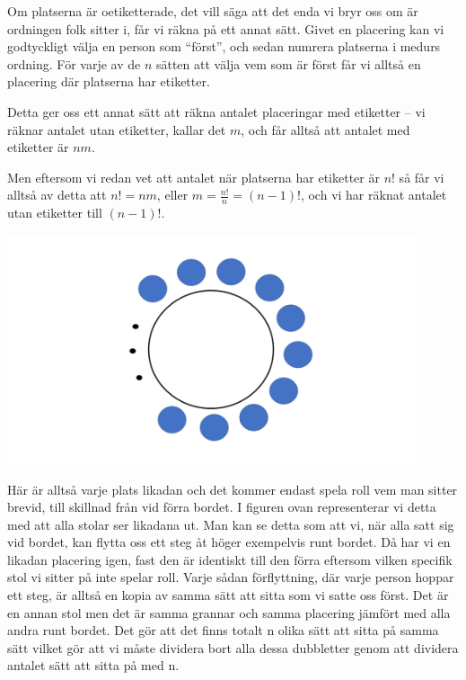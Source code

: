 \documentclass{tufte-handout}
\begin{document}
\begin{example}
	Om platserna är oetiketterade, det vill säga att det enda vi bryr oss om är ordningen folk sitter i, får vi räkna på ett annat sätt. Givet en placering kan vi godtyckligt välja en person som ``först'', och sedan numrera platserna i medurs ordning. För varje av de $n$ sätten att välja vem som är först får vi alltså en placering där platserna har etiketter.

	Detta ger oss ett annat sätt att räkna antalet placeringar med etiketter -- vi räknar antalet utan etiketter, kallar det $m$, och får alltså att antalet med etiketter är $nm$.

	Men eftersom vi redan vet att antalet när platserna har etiketter är $n!$ så får vi alltså av detta att $n! = nm$, eller $m = \frac{n!}{n} = (n-1)!$, och vi har räknat antalet utan etiketter till $(n-1)!$.
 
	\begin{center}
		\includegraphics[width=0.9\textwidth]{graphics/bordutanfarg1.png}
	\end{center}

       Här är alltså varje plats likadan och det kommer endast spela roll vem man sitter brevid, till skillnad från vid förra bordet. I figuren ovan representerar vi detta med att alla stolar ser likadana ut. Man kan se detta som att vi, när alla satt sig vid bordet, kan flytta oss ett steg åt höger exempelvis runt bordet. Då har vi en likadan placering igen, fast den är identiskt till den förra eftersom vilken specifik stol vi sitter på inte spelar roll. Varje sådan förflyttning, där varje person hoppar ett steg, är alltså en kopia av samma sätt att sitta som vi satte oss först. Det är en annan stol men det är samma grannar och samma placering jämfört med alla andra runt bordet. Det gör att det finns totalt n olika sätt att sitta på samma sätt vilket gör att vi måste dividera bort alla dessa dubbletter genom att dividera antalet sätt att sitta på med n.  
\end{example}
\end{document}
